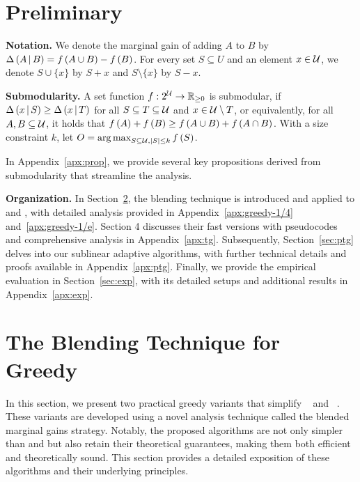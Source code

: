 \section{Preliminary}
\textbf{Notation.}
We denote the marginal gain of adding $A$ to $B$ by $\Delta \left( A \, \middle| \, B \right) = f \left( A\cup B \right) - f \left( B \right)$.
For every set $S\subseteq U$ and an element $x\in \mathcal U$,
we denote $S\cup \{x\}$ by $S+x$ and $S\setminus \{x\}$ by $S-x$.

\textbf{Submodularity.}
A set function $f:2^\mathcal U\to \mathbb{R}_{\ge 0}$ is submodular, 
if $\Delta \left( x \, \middle| \, S \right)\ge \Delta \left( x \, \middle| \, T \right)$ for all $S\subseteq T\subseteq \mathcal U$
and $x\in \mathcal U\setminus T$,
or equivalently, for all $A, B\subseteq \mathcal U$,
it holds that $f \left( A \right) + f \left( B \right)\ge f \left( A\cup B \right) + f \left( A\cap B \right)$.
With a size constraint $k$,
let $O =\operatorname*{arg\,max}_{S\subseteq \mathcal U, |S| \le k} f \left( S \right)$.

In Appendix~\ref{apx:prop}, we provide several key propositions
derived from submodularity that streamline the analysis.

\textbf{Organization.}
In Section~\ref{sec:gd}, the blending technique is introduced
and applied to \ig and \itg,
with detailed analysis provided in Appendix~\ref{apx:greedy-1/4}
and~\ref{apx:greedy-1/e}.
Section 4 discusses their fast versions with
pseudocodes and comprehensive analysis in
Appendix~\ref{apx:tg}.
Subsequently, Section~\ref{sec:ptg} delves into our sublinear adaptive algorithms, 
with further technical details and proofs available in Appendix~\ref{apx:ptg}.
Finally, we provide the empirical evaluation in Section~\ref{sec:exp},
with its detailed setups and additional results
in Appendix~\ref{apx:exp}.


\section{The Blending Technique for Greedy}\label{sec:gd}
In this section, we present two practical greedy variants
that simplify \ig~\citep{DBLP:conf/nips/Kuhnle19} and \itg~\citep{DBLP:conf/kdd/ChenK23}.
These variants are developed using a novel analysis technique 
called the blended marginal gains strategy. 
Notably, the proposed algorithms are not only simpler than \ig and \itg 
but also retain their theoretical guarantees, 
making them both efficient and theoretically sound. 
This section provides a detailed exposition of these algorithms and their underlying principles.

